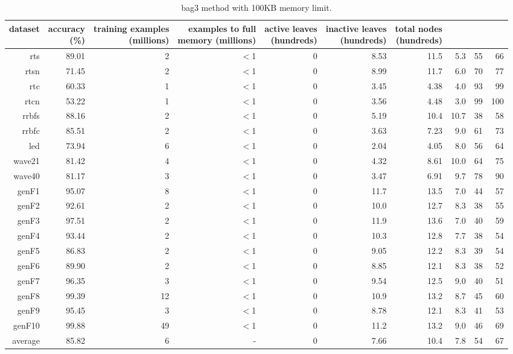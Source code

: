 \begin{table}
\caption{{\sc bag3} method with 100KB memory limit.}
\label{tab:bag3-100k}
\centering
\begin{tabular}{|r|r|r|r|r|r|r|r|r|r|}
\hline
dataset	&
\rotatebox{90}{\parbox{9em}{accuracy\\(\%)}} &
\rotatebox{90}{\parbox{9em}{training examples\\(millions)}} &
\rotatebox{90}{\parbox{9em}{examples to full\\memory (millions)}} &
\rotatebox{90}{\parbox{9em}{active leaves\\(hundreds)}} &
\rotatebox{90}{\parbox{9em}{inactive leaves\\(hundreds)}} &
\rotatebox{90}{\parbox{9em}{total nodes\\(hundreds)}} &
\rotatebox{90}{\parbox{9em}{average tree depth}}	&
\rotatebox{90}{\parbox{9em}{training speed (\%)}} &
\rotatebox{90}{\parbox{9em}{prediction speed (\%)}} \\
\hline
{\sc rts} & 89.01 & 2 & $<$1 & 0 & 8.53 & 11.5 & 5.3 & 55 & 66 \\
{\sc rtsn} & 71.45 & 2 & $<$1 & 0 & 8.99 & 11.7 & 6.0 & 70 & 77 \\
{\sc rtc} & 60.33 & 1 & $<$1 & 0 & 3.45 & 4.38 & 4.0 & 93 & 99 \\
{\sc rtcn} & 53.22 & 1 & $<$1 & 0 & 3.56 & 4.48 & 3.0 & 99 & 100 \\
{\sc rrbfs} & 88.16 & 2 & $<$1 & 0 & 5.19 & 10.4 & 10.7 & 38 & 58 \\
{\sc rrbfc} & 85.51 & 2 & $<$1 & 0 & 3.63 & 7.23 & 9.0 & 61 & 73 \\
{\sc led} & 73.94 & 6 & $<$1 & 0 & 2.04 & 4.05 & 8.0 & 56 & 64 \\
{\sc wave21} & 81.42 & 4 & $<$1 & 0 & 4.32 & 8.61 & 10.0 & 64 & 75 \\
{\sc wave40} & 81.17 & 3 & $<$1 & 0 & 3.47 & 6.91 & 9.7 & 78 & 90 \\
{\sc genF1} & 95.07 & 8 & $<$1 & 0 & 11.7 & 13.5 & 7.0 & 44 & 57 \\
{\sc genF2} & 92.61 & 2 & $<$1 & 0 & 10.0 & 12.7 & 8.3 & 38 & 55 \\
{\sc genF3} & 97.51 & 2 & $<$1 & 0 & 11.9 & 13.6 & 7.0 & 40 & 59 \\
{\sc genF4} & 93.44 & 2 & $<$1 & 0 & 10.3 & 12.8 & 7.7 & 38 & 54 \\
{\sc genF5} & 86.83 & 2 & $<$1 & 0 & 9.05 & 12.2 & 8.3 & 39 & 54 \\
{\sc genF6} & 89.90 & 2 & $<$1 & 0 & 8.85 & 12.1 & 8.3 & 38 & 52 \\
{\sc genF7} & 96.35 & 3 & $<$1 & 0 & 9.54 & 12.5 & 9.0 & 40 & 51 \\
{\sc genF8} & 99.39 & 12 & $<$1 & 0 & 10.9 & 13.2 & 8.7 & 45 & 60 \\
{\sc genF9} & 95.45 & 3 & $<$1 & 0 & 8.78 & 12.1 & 8.3 & 41 & 53 \\
{\sc genF10} & 99.88 & 49 & $<$1 & 0 & 11.2 & 13.2 & 9.0 & 46 & 69 \\
\hline
average & 85.82 & 6 &  -  & 0 & 7.66 & 10.4 & 7.8 & 54 & 67 \\
\hline
\end{tabular}
\end{table}
